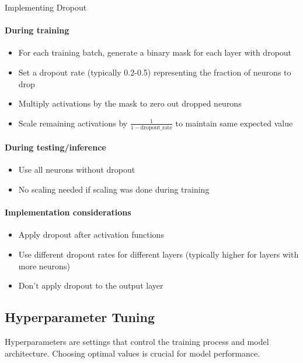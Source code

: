 \begin{KR}{Implementing Dropout}
\paragraph{During training}
\begin{itemize}
    \item For each training batch, generate a binary mask for each layer with dropout
    \item Set a dropout rate (typically 0.2-0.5) representing the fraction of neurons to drop
    \item Multiply activations by the mask to zero out dropped neurons
    \item Scale remaining activations by $\frac{1}{1-\text{dropout\_rate}}$ to maintain same expected value
\end{itemize}

\paragraph{During testing/inference}
\begin{itemize}
    \item Use all neurons without dropout
    \item No scaling needed if scaling was done during training
\end{itemize}

\paragraph{Implementation considerations}
\begin{itemize}
    \item Apply dropout after activation functions
    \item Use different dropout rates for different layers (typically higher for layers with more neurons)
    \item Don't apply dropout to the output layer
\end{itemize}
\end{KR}




\subsection{Hyperparameter Tuning}

Hyperparameters are settings that control the training process and model architecture. Choosing optimal values is crucial for model performance.

